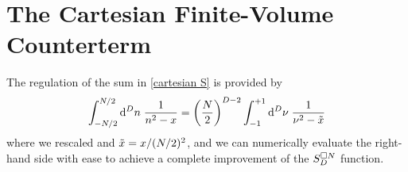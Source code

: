 \section{The Cartesian \Luscher Finite-Volume Counterterm}\label{sec:counterterm/cartesian}

The regulation of the sum in \eqref{cartesian S} is provided by
\begin{equation}
    \label{eq:cartesian S counterterm}
    \int_{-N/2}^{N/2} \mathrm{d}^Dn\; \frac{1}{n^2-x}
    =
    \left(\frac{N}{2}\right)^{D-2} \int_{-1}^{+1} \mathrm{d}^D\nu\; \frac{1}{\nu^2 - \tilde{x}}
\end{equation}
where we rescaled and $\tilde{x}=x/(N/2)^2$, and we can numerically evaluate the right-hand side with ease to achieve a complete improvement of the $S_D^{\square N}$ function.

